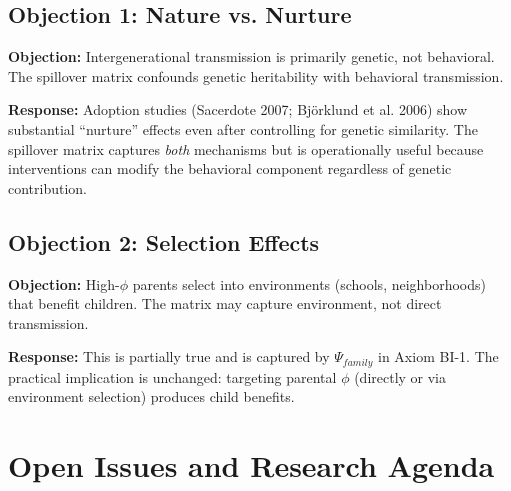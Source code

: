 \subsection{Objection 1: Nature vs. Nurture}

\textbf{Objection:} Intergenerational transmission is primarily genetic, not behavioral.
The spillover matrix confounds genetic heritability with behavioral transmission.

\textbf{Response:} Adoption studies (Sacerdote 2007; Björklund et al. 2006) show substantial
``nurture'' effects even after controlling for genetic similarity. The spillover matrix
captures \textit{both} mechanisms but is operationally useful because interventions can
modify the behavioral component regardless of genetic contribution.

\subsection{Objection 2: Selection Effects}

\textbf{Objection:} High-$\phi$ parents select into environments (schools, neighborhoods)
that benefit children. The matrix may capture environment, not direct transmission.

\textbf{Response:} This is partially true and is captured by $\Psi_{family}$ in Axiom BI-1.
The practical implication is unchanged: targeting parental $\phi$ (directly or via
environment selection) produces child benefits.


\section{Open Issues and Research Agenda}
\label{sec:BI-open}

